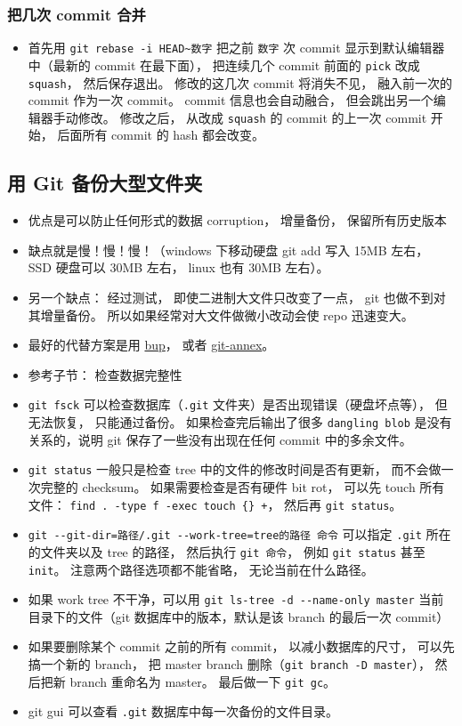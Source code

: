 \subsubsection{把几次 commit 合并}
\begin{itemize}
\item 首先用 \verb`git rebase -i HEAD~数字` 把之前 \verb`数字` 次 commit 显示到默认编辑器中（最新的 commit 在最下面）， 把连续几个 commit 前面的 \verb`pick` 改成 \verb`squash`， 然后保存退出。 修改的这几次 commit 将消失不见， 融入前一次的 commit 作为一次 commit。 commit 信息也会自动融合， 但会跳出另一个编辑器手动修改。 修改之后， 从改成 \verb`squash` 的 commit 的上一次 commit 开始， 后面所有 commit 的 hash 都会改变。
\end{itemize}


\subsection{用 Git 备份大型文件夹}
\begin{itemize}
\item 优点是可以防止任何形式的数据 corruption， 增量备份， 保留所有历史版本
\item 缺点就是慢！慢！慢！（windows 下移动硬盘 git add 写入 15MB 左右， SSD 硬盘可以 30MB 左右， linux 也有 30MB 左右）。
\item 另一个缺点： 经过测试， 即使二进制大文件只改变了一点， git 也做不到对其增量备份。 所以如果经常对大文件做微小改动会使 repo 迅速变大。
\item 最好的代替方案是用 \href{https://bup.github.io/}{bup}， 或者 \href{https://git-annex.branchable.com/}{git-annex}。
\item 参考子节： 检查数据完整性
\item \verb`git fsck` 可以检查数据库（\verb`.git` 文件夹）是否出现错误（硬盘坏点等）， 但无法恢复， 只能通过备份。 如果检查完后输出了很多 \verb`dangling blob` 是没有关系的，说明 git 保存了一些没有出现在任何 commit 中的多余文件。
\item \verb`git status` 一般只是检查 tree 中的文件的修改时间是否有更新， 而不会做一次完整的 checksum。 如果需要检查是否有硬件 bit rot， 可以先 touch 所有文件： \verb`find . -type f -exec touch {} +`， 然后再 \verb`git status`。
\item \verb`git --git-dir=路径/.git --work-tree=tree的路径 命令` 可以指定 \verb`.git` 所在的文件夹以及 tree 的路径， 然后执行 \verb`git 命令`， 例如 \verb`git status` 甚至 \verb`init`。 注意两个路径选项都不能省略， 无论当前在什么路径。
\item 如果 work tree 不干净，可以用 \verb`git ls-tree -d --name-only master` 当前目录下的文件（git 数据库中的版本，默认是该 branch 的最后一次 commit）
\item 如果要删除某个 commit 之前的所有 commit， 以减小数据库的尺寸， 可以先搞一个新的 branch， 把 master branch 删除（\verb`git branch -D master`）， 然后把新 branch 重命名为 master。 最后做一下 \verb`git gc`。
\item git gui 可以查看 \verb`.git` 数据库中每一次备份的文件目录。
\end{itemize}

